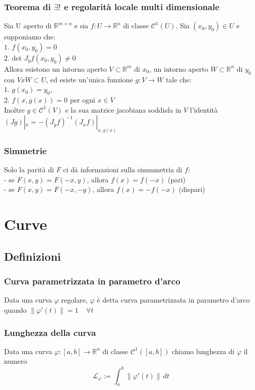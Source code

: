 \documentclass{article} %
\begin{document}
    \subsubsection*{Teorema di $\exists !$ e regolarità locale multi dimensionale}
    Sia U aperto di $\mathbb{R}^{m+n}$ e sia $f:U \to \mathbb{R}^n$ di classe $\mathcal{C}^1\left(U\right)$. Sia $(x_0,y_0) \in U$ e supponiamo che: \\
    $1.$ $f(x_0,y_0)=0$ \\
    $2.$ det $J_{y}f(x_0,y_0) \neq 0$ \\
    Allora esistono un intorno aperto $V \subset \mathbb{R}^m$ di $x_0$, un intorno aperto $W \subset \mathbb{R}^n$ di $y_0$ con $V x W \subset U$, ed esiste un'unica funzione $g: V \to W$ tale che: \\
    $1.$ $g(x_0)=y_0$, \\
    $2.$ $f(x,g(x))=0$ per ogni $x \in V$ \\
    Inoltre $g \in \mathcal{C}^1(V)$ e la sua matrice jacobiana soddisfa in $V$ l'identità \\
    $(Jg)|_x = -(J_yf)^{-1}(J_xf)|_{x,g(x)}$ 

    \subsubsection*{Simmetrie}
    Solo la parità di $F$ ci dà informazioni sulla simmmetria di $f$: \\
    - se $F(x,y)=F(-x,y)$, allora $f(x)=f(-x)$ (pari)  \\
    - se $F(x,y)=F(-x,-y)$, allora $f(x)=-f(-x)$ (dispari)


    \section{Curve}
    \subsection{Definizioni}
    \subsubsection*{Curva parametrizzata in parametro d'arco}
    Data una curva $\varphi$ regolare, $\varphi$ è detta curva parametrizzata in parametro d'arco
    quando $ \| \varphi  '(t) \| = 1 \ \ \ \ \ \forall t $

    \subsubsection*{Lunghezza della curva}
    Data una curva $\varphi:[a,b]\to \mathbb{R} ^n $ di classe $ \mathcal{C} ^1([a,b]) $ chiamo 
    lunghezza di $\varphi$ il numero 
    $$ \mathcal{L} _\varphi := \int_{a}^{b} \| \varphi  '(t) \| \, dt  $$
\end{document}
